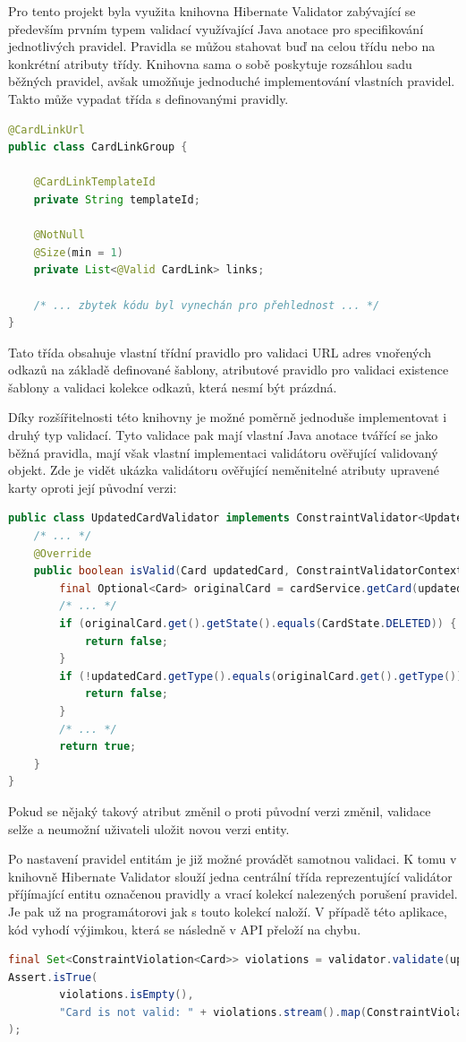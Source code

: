 \begin{itemize}
\begin{itemize}
		Pro tento projekt byla využita knihovna Hibernate Validator zabývající se především prvním typem validací
		využívající Java anotace pro specifikování jednotlivých pravidel.
		Pravidla se můžou stahovat buď na celou třídu nebo na konkrétní atributy třídy.
		Knihovna sama o sobě poskytuje rozsáhlou sadu běžných pravidel, avšak umožňuje jednoduché implementování vlastních
		pravidel.
		Takto může vypadat třída s definovanými pravidly.
		\begin{lstlisting}[language=Java]
@CardLinkUrl
public class CardLinkGroup {

	@CardLinkTemplateId
	private String templateId;

	@NotNull
	@Size(min = 1)
	private List<@Valid CardLink> links;

	/* ... zbytek kódu byl vynechán pro přehlednost ... */
}
		\end{lstlisting}
		Tato třída obsahuje vlastní třídní pravidlo pro validaci \ac{URL} adres vnořených odkazů na základě definované šablony,
		atributové pravidlo pro validaci existence šablony a validaci kolekce odkazů, která nesmí být prázdná.

		Díky rozšířitelnosti této knihovny je možné poměrně jednoduše implementovat i druhý typ validací.
		Tyto validace pak mají vlastní Java anotace tvářící se jako běžná pravidla, mají však vlastní implementaci
		validátoru ověřující validovaný objekt.
		Zde je vidět ukázka validátoru ověřující neměnitelné atributy upravené karty oproti její původní verzi:
		\begin{lstlisting}[language=Java]
public class UpdatedCardValidator implements ConstraintValidator<UpdatedCard, Card> {
	/* ... */
	@Override
	public boolean isValid(Card updatedCard, ConstraintValidatorContext context) {
		final Optional<Card> originalCard = cardService.getCard(updatedCard.getId(), true);
		/* ... */
		if (originalCard.get().getState().equals(CardState.DELETED)) {
			return false;
		}
		if (!updatedCard.getType().equals(originalCard.get().getType())) {
			return false;
		}
		/* ... */
		return true;
	}
}
		\end{lstlisting}
		Pokud se nějaký takový atribut změnil o proti původní verzi změnil, validace selže a neumožní uživateli
		uložit novou verzi entity.

		Po nastavení pravidel entitám je již možné provádět samotnou validaci.
		K tomu v knihovně Hibernate Validator slouží jedna centrální třída reprezentující validátor příjímající
		entitu označenou pravidly a vrací kolekcí nalezených porušení pravidel.
		Je pak už na programátorovi jak s touto kolekcí naloží.
		V případě této aplikace, kód vyhodí výjimkou, která se následně v \ac{API} přeloží na chybu.
		\begin{lstlisting}[language=Java]
final Set<ConstraintViolation<Card>> violations = validator.validate(updatedCard);
Assert.isTrue(
		violations.isEmpty(),
		"Card is not valid: " + violations.stream().map(ConstraintViolation::getMessage).collect(Collectors.joining("; "))
);
		\end{lstlisting}


\end{itemize}
\end{itemize}
